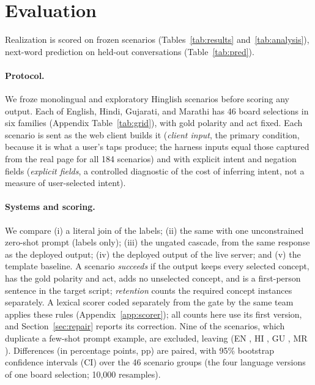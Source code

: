\section{Evaluation}
\label{sec:eval}

Realization is scored on \NPrimAll{} frozen scenarios (Tables~\ref{tab:results} and~\ref{tab:analysis}), next-word prediction on held-out conversations (Table~\ref{tab:pred}).

\paragraph{Protocol.}
We froze \NScen{} monolingual and \NScenCM{} exploratory Hinglish scenarios before scoring any output.
Each of English, Hindi, Gujarati, and Marathi has 46 board selections in six families (Appendix Table~\ref{tab:grid}), with gold polarity and act fixed.
Each scenario is sent as the web client builds it (\emph{client input}, the primary condition, because it is what a user's taps produce; the harness inputs equal those captured from the real page for all 184 scenarios) and with explicit intent and negation fields (\emph{explicit fields}, a controlled diagnostic of the cost of inferring intent, not a measure of user-selected intent).

\paragraph{Systems and scoring.}
We compare (i) a literal join of the labels; (ii) the same \qwen{} with one unconstrained zero-shot prompt (labels only); (iii) the ungated cascade, from the same response as the deployed output; (iv) the deployed output of the live server; and (v) the template baseline.
A scenario \emph{succeeds} if the output keeps every selected concept, has the gold polarity and act, adds no unselected concept, and is a first-person sentence in the target script; \emph{retention} counts the \NConc{} required concept instances separately.
A lexical scorer coded separately from the gate by the same team applies these rules (Appendix~\ref{app:scorer}); all counts here use its first version, and Section~\ref{sec:repair} reports its correction.
Nine of the \NScen{} scenarios, which duplicate a few-shot prompt example, are excluded, leaving \NPrimAll{} (EN \NPrimEN{}, HI \NPrimHI{}, GU \NPrimGU{}, MR \NPrimMR{}).
Differences (in percentage points, pp) are paired, with 95\% bootstrap confidence intervals (CI) over the 46 scenario groups (the four language versions of one board selection; 10,000 resamples).

